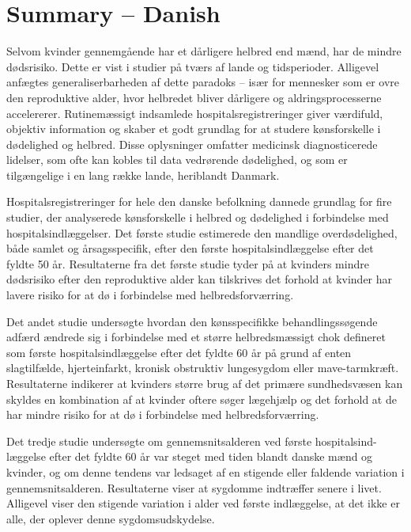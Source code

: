



\chapter{Summary -- Danish}

Selvom kvinder gennemg{\aa}ende har et d{\aa}rligere helbred end m{\ae}nd, 
har de mindre d{\o}dsrisiko. Dette er vist i studier p{\aa}  tv{\ae}rs af 
lande og tidsperioder. Alligevel anf{\ae}gtes generaliserbarheden af dette 
paradoks -- is{\ae}r for mennesker som er ovre den reproduktive alder, hvor 
helbredet bliver d{\aa}rligere og aldringsprocesserne accelererer. Rutinem{\ae}ssigt 
indsamlede hospitalsregistreringer giver v{\ae}rdifuld, objektiv 
information og skaber et godt grundlag for at studere k{\o}nsforskelle i 
d{\o}delighed og helbred. Disse oplysninger omfatter medicinsk diagnosticerede 
lidelser, som ofte kan kobles til data vedr{\o}rende d{\o}delighed, og som 
er tilg{\ae}ngelige i en lang r{\ae}kke lande, heriblandt Danmark.

Hospitalsregistreringer for hele den danske befolkning dannede grundlag 
for fire studier, der analyserede k{\o}nsforskelle i helbred og d{\o}delighed 
i forbindelse med hospitalsindl{\ae}ggelser. Det f{\o}rste studie estimerede 
den mandlige overd{\o}delighed, b{\aa}de samlet og {\aa}rsagsspecifik, efter 
den f{\o}rste hospitalsindl{\ae}ggelse efter det fyldte 50 {\aa}r. Resultaterne 
fra det f{\o}rste studie tyder p{\aa} at kvinders mindre d{\o}dsrisiko efter 
den reproduktive alder kan tilskrives det forhold at kvinder har lavere risiko 
for at d{\o} i forbindelse med helbredsforv{\ae}rring.

Det andet studie unders{\o}gte hvordan den k{\o}nsspecifikke behandlingss{\o}gende 
adf{\ae}rd {\ae}ndrede sig i forbindelse med et st{\o}rre helbredsm{\ae}ssigt chok 
defineret som f{\o}rste hospitalsindl{\ae}ggelse efter det fyldte 60 {\aa}r p{\aa} 
grund af enten slagtilf{\ae}lde, hjerteinfarkt, kronisk obstruktiv lungesygdom eller 
mave-tarmkr{\ae}ft. Resultaterne indikerer at kvinders st{\o}rre brug af det prim{\ae}re 
sundhedsv{\ae}sen kan skyldes en kombination af at kvinder oftere s{\o}ger l{\ae}gehj{\ae}lp 
og det forhold at de har mindre risiko for at d{\o} i forbindelse med helbredsforv{\ae}rring.


Det tredje studie unders{\o}gte om gennemsnitsalderen ved f{\o}rste hospitalsind- l{\ae}ggelse 
efter det fyldte 60 {\aa}r var steget med tiden blandt danske m{\ae}nd og kvinder, og 
om denne tendens var ledsaget af en stigende eller faldende variation i gennemsnitsalderen. 
Resultaterne viser at sygdomme indtr{\ae}ffer senere i livet. Alligevel viser den stigende 
variation i alder ved f{\o}rste indl{\ae}ggelse, at det ikke er alle, der oplever denne 
sygdomsudskydelse.

